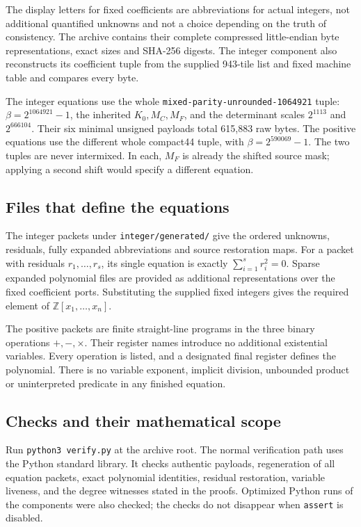 \documentclass[11pt,letterpaper]{article}
\newcommand{\Z}{\mathbb Z}
\theoremstyle{definition}
\theoremstyle{remark}
\begin{document}
The display letters for fixed coefficients are abbreviations for actual
integers, not additional quantified unknowns and not a choice depending on
the truth of consistency. The archive contains their complete compressed
little-endian byte representations, exact sizes and SHA-256 digests. The
integer component also reconstructs its coefficient tuple from the supplied
943-tile list and fixed machine table and compares every byte.

The integer equations use the whole
\texttt{mixed-parity-unrounded-1064921} tuple:
$\beta=2^{1064921}-1$, the inherited $K_0,M_C,M_F$, and
the determinant scales $2^{1113}$ and $2^{666104}$. Their six minimal
unsigned payloads total 615,883 raw bytes. The positive equations use the
different whole compact44 tuple, with $\beta=2^{590069}-1$.
The two tuples are never intermixed. In each, $M_F$ is already the shifted
source mask; applying a second shift would specify a different equation.

\subsection{Files that define the equations}

The integer packets under \texttt{integer/generated/} give the ordered
unknowns, residuals, fully expanded abbreviations and source restoration
maps. For a packet with residuals $r_1,\ldots,r_s$, its single equation
is exactly $\sum_{i=1}^s r_i^2=0$. Sparse expanded polynomial files are
provided as additional representations over the fixed coefficient ports.
Substituting the supplied fixed integers gives the required element of
$\Z[x_1,\ldots,x_n]$.

The positive packets are finite straight-line programs in the three binary
operations $+,-,\times$. Their register names introduce no additional
existential variables. Every operation is listed, and a designated final
register defines the polynomial. There is no variable exponent, implicit
division, unbounded product or uninterpreted predicate in any finished
equation.

\subsection{Checks and their mathematical scope}

Run \texttt{python3 verify.py} at the archive root. The normal verification
path uses the Python standard library. It checks authentic payloads,
regeneration of all equation packets, exact polynomial identities,
residual restoration, variable liveness, and the degree witnesses stated
in the proofs. Optimized Python runs of the components were also checked;
the checks do not disappear when \texttt{assert} is disabled.
\end{document}
